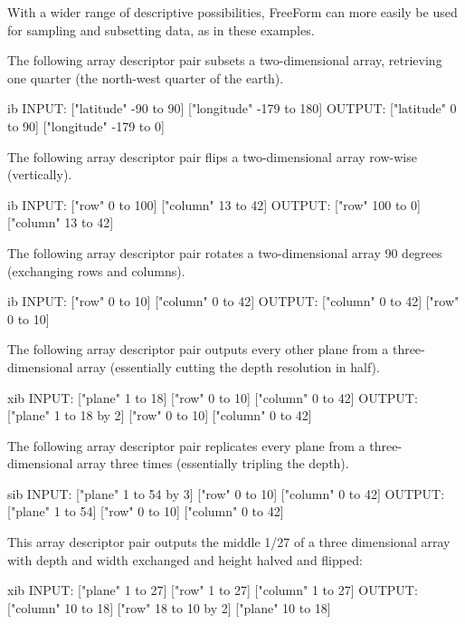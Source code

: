 With a wider range of descriptive possibilities, FreeForm can more
easily be used for sampling and subsetting data, as in these examples.

The following array descriptor pair subsets a two-dimensional array,
retrieving one quarter (the north-west quarter of the earth).

\begin{vcode}{ib}
INPUT: ["latitude" -90 to 90] ["longitude" -179 to 180]
OUTPUT: ["latitude" 0 to 90] ["longitude" -179 to 0]  
\end{vcode}

The following array descriptor pair flips a two-dimensional array
row-wise (vertically).

\begin{vcode}{ib}
INPUT: ["row" 0 to 100] ["column" 13 to 42]
OUTPUT: ["row" 100 to 0] ["column" 13 to 42]  
\end{vcode}

The following array descriptor pair rotates a two-dimensional array 90
degrees (exchanging rows and columns).

\begin{vcode}{ib}
INPUT: ["row" 0 to 10] ["column" 0 to 42]
OUTPUT: ["column" 0 to 42] ["row" 0 to 10]  
\end{vcode}

The following array descriptor pair outputs every other plane from a
three-dimensional array (essentially cutting the depth resolution in
half).

\begin{vcode}{xib}
INPUT: ["plane" 1 to 18] ["row" 0 to 10] ["column" 0 to 42]
OUTPUT: ["plane" 1 to 18 by 2] ["row" 0 to 10] ["column" 0 to 42]  
\end{vcode}

The following array descriptor pair replicates every plane from a
three-dimensional array three times (essentially tripling the depth).

\begin{vcode}{sib}
INPUT: ["plane" 1 to 54 by 3] ["row" 0 to 10] ["column" 0 to 42]
OUTPUT: ["plane" 1 to 54] ["row" 0 to 10] ["column" 0 to 42]  
\end{vcode}

This array descriptor pair outputs the middle 1/27 of a three
dimensional array with depth and width exchanged and height halved and
flipped:

\begin{vcode}{xib}
INPUT: ["plane" 1 to 27] ["row" 1 to 27] ["column" 1 to 27]
OUTPUT: ["column" 10 to 18] ["row" 18 to 10 by 2] ["plane" 10 to 18]  
\end{vcode}







